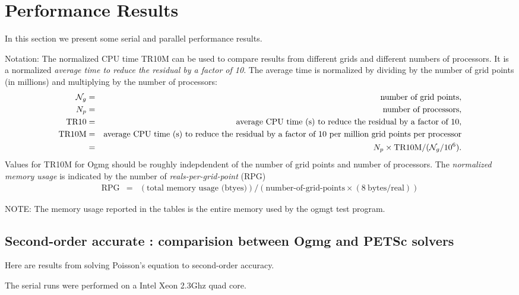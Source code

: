 \section{Performance Results}\label{sec:performanceResults}

In this section we present some serial and parallel performance results.


\noindent Notation:
The normalized CPU time TR10M can be used to compare results from different grids and different numbers of processors.
It is a normalized {\em average time to reduce the residual by a factor of 10}. The average time is normalized 
by dividing by the number of grid points (in millions) and multiplying by the number of processors: 
\begin{eqnarray*}
 \mathcal{N}_g &=& \mbox{number of grid points}, \\
 N_p &=& \mbox{number of processors}, \\
 \mbox{TR10} &=& \mbox{average CPU time (s) to reduce the residual by a factor of $10$}, \\
 \mbox{TR10M} &=& \mbox{average CPU time (s) to reduce the residual by a factor of $10$ per million grid points per processor} \\
              &=& N_p \times \mbox{TR10M}/( \mathcal{N}_g/10^6) .
\end{eqnarray*}
Values for TR10M for Ogmg should be roughly indepdendent of the number of grid points and number of processors. 
The {\em normalized memory usage} is indicated by the number of {\em reals-per-grid-point} (RPG)
\begin{eqnarray*}
 \mbox{RPG} &=& (\mbox{total memory usage (btyes)})/(\mbox{number-of-grid-points} \times (8~\mbox{bytes/real}))
\end{eqnarray*}

NOTE: The memory usage reported in the tables is the entire memory used by the ogmgt test program. 

\clearpage
\subsection{Second-order accurate : comparision between Ogmg and PETSc solvers}

Here are results from solving Poisson's equation to second-order accuracy.

The serial runs were performed on a Intel Xeon 2.3Ghz quad core.

